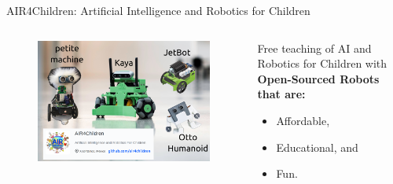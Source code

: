 {
\begin{frame}{AIR4Children: Artificial Intelligence and Robotics for Children}

\begin{columns}

\begin{column}{.6\linewidth}
      \begin{figure}
        \centering
        \includegraphics[width=1.0\textwidth]{./figs/air4children/versions/drawing-v00.png}
      \end{figure}
\end{column}

\begin{column}{.4\linewidth}
	Free teaching of AI and Robotics for Children with
	\textbf{Open-Sourced Robots that are:}
        \begin{itemize}
	 \item Affordable,
	 \item Educational, and
	 \item Fun.
        \end{itemize}	
\end{column}

\end{columns}

\end{frame}
}

